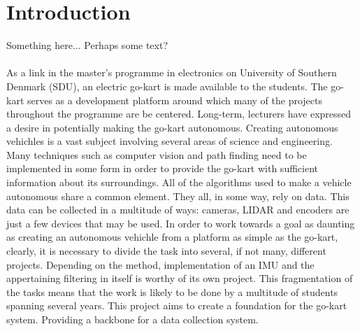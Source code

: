 \section{Introduction} %
\label{sec:introduction}
Something here... Perhaps some text?\\~~\\
As a link in the master's programme in electronics on University of Southern Denmark (SDU), an electric go-kart is made available to the students.
The go-kart serves as a development platform around which many of the projects throughout the programme are be centered.
Long-term, lecturers have expressed a desire in potentially making the go-kart autonomous.
Creating autonomous vehichles is a vast subject involving several areas of science and engineering.
Many techniques such as computer vision and path finding need to be implemented in some form in order to provide the go-kart with sufficient information about its surroundings.
All of the algorithms used to make a vehicle autonomous share a common element.
They all, in some way, rely on data.
This data can be collected in a multitude of ways: cameras, LIDAR and encoders are just a few devices that may be used.
In order to work towards a goal as daunting as creating an autonomous vehichle from a platform as simple as the go-kart, clearly, it is necessary to divide the task into several, if not many, different projects.
Depending on the method, implementation of an IMU and the appertaining filtering in itself is worthy of its own project.
This fragmentation of the tasks means that the work is likely to be done by a multitude of students spanning several years.
This project aims to create a foundation for the go-kart system.
Providing a backbone for a data collection system.
